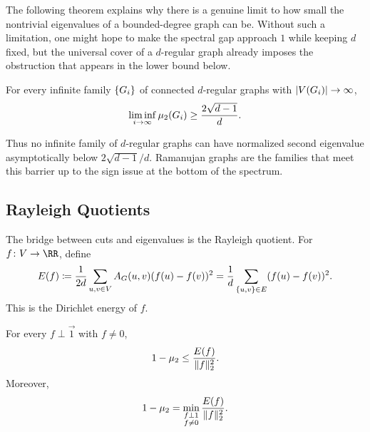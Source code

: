 The following theorem explains why there is a genuine limit to how small the nontrivial eigenvalues of a bounded-degree graph can be. Without such a limitation, one might hope to make the spectral gap approach \(1\) while keeping \(d\) fixed, but the universal cover of a \(d\)-regular graph already imposes the obstruction that appears in the lower bound below.

\begin{theorem}
	\label{thm:alon-boppana}
	For every infinite family \(\{G_i\}\) of connected \(d\)-regular graphs with \(\lvert V(G_i)\rvert\to\infty\),
	\begin{equation}
		\liminf_{i\to\infty}\mu_2(G_i)\geq \frac{2\sqrt{d-1}}{d}.
	\end{equation}
\end{theorem}

Thus no infinite family of \(d\)-regular graphs can have normalized second eigenvalue asymptotically below \(2\sqrt{d-1}/d\). Ramanujan graphs are the families that meet this barrier up to the sign issue at the bottom of the spectrum.

\subsection{Rayleigh Quotients}
\label{subsec:rayleigh}

The bridge between cuts and eigenvalues is the Rayleigh quotient. For \(f\colon \Vertices\to\RR\), define
\begin{equation}
	E(f)\coloneqq \frac{1}{2d}\sum_{u,v\in V}A_{G}(u,v)(f(u)-f(v))^2=\frac{1}{d}\sum_{\{u,v\}\in E}(f(u)-f(v))^2.
\end{equation}
This is the Dirichlet energy of \(f\).

\begin{lemma}
	\label{lem:rayleigh}
	For every \(f\perp\vec{1}\) with \(f\neq 0\),
	\begin{equation}
		1-\mu_2\leq \frac{E(f)}{\lVert f\rVert_2^2}.
	\end{equation}
	Moreover,
	\begin{equation}
		1-\mu_2=\min_{\substack{f\perp1\\f\neq 0}}\frac{E(f)}{\lVert f\rVert_2^2}.
	\end{equation}
\end{lemma}

